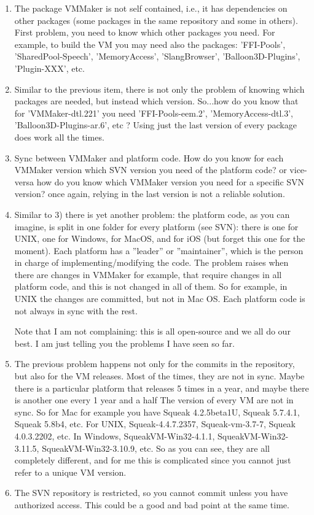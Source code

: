 \documentclass[a4paper,10pt,twoside]{book}
\begin{document}
\begin{enumerate}
\item The package VMMaker is not self contained, i.e., it has dependencies on other packages (some packages in the same repository and some in others). First problem, you need to know which other packages you need. For example, to build the VM you may need also the packages: 'FFI-Pools', 'SharedPool-Speech', 'MemoryAccess', 'SlangBrowser', 'Balloon3D-Plugins', 'Plugin-XXX', etc.

\item Similar to the previous item, there is not only the problem of knowing which packages are needed, but instead which version. So...how do you know that for 'VMMaker-dtl.221' you need 'FFI-Pools-eem.2', 'MemoryAccess-dtl.3', 'Balloon3D-Plugins-ar.6', etc ?  Using just the last version of every package does work all the times.

\item Sync between VMMaker and platform code. How do you know for each VMMaker version which SVN version you need of the platform code? or vice-versa how do you know which VMMaker version you need for a specific SVN version? once again, relying in the last version is not a reliable solution.


\item Similar to 3) there is yet another problem: the platform code, as you can imagine, is split in one folder for every platform (see SVN): there is one for UNIX, one for Windows, for MacOS, and for iOS (but forget this one for the moment). Each platform has a ''leader'' or ''maintainer'', which is the person in charge of implementing/modifying the code. The problem raises when there are changes in VMMaker for example, that require changes in all platform code, and this is not changed in all of them. So for example, in UNIX the changes are committed, but not in Mac OS. Each platform code is not always in sync with the rest. 

Note that I am not complaining: this is all open-source and we all do our best. I am just telling you the problems I have seen so far.

\item The previous problem happens not only for the commits in the repository, but also for the VM releases. Most of the times, they are not in sync. Maybe there is a particular platform that releases 5 times in a year, and maybe there is another one every 1 year and a half 
The version of every VM are not in sync. So for Mac for example you have Squeak 4.2.5beta1U, Squeak 5.7.4.1, Squeak 5.8b4, etc. For UNIX, Squeak-4.4.7.2357, Squeak-vm-3.7-7, Squeak 4.0.3.2202, etc.  In Windows, SqueakVM-Win32-4.1.1, SqueakVM-Win32-3.11.5, SqueakVM-Win32-3.10.9, etc. So as you can see, they are all completely different, and for me this is complicated since you cannot just refer to a unique VM version.


\item The SVN repository is restricted, so you cannot commit unless you have authorized access. This could be a good and bad point at the same time.
\end{enumerate}
\end{document}
